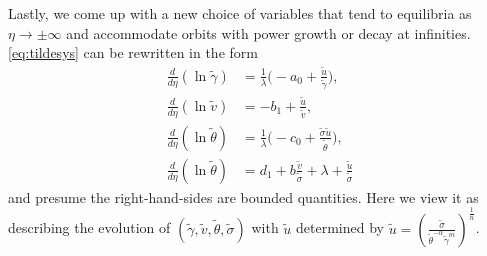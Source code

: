 \documentclass[a4paper,11pt]{article}
\def\tg{{\tilde{\gamma}}}
\def\tv{{\tilde{v}}}
\def\tth{{\tilde{\theta}}}
\def\ts{{\tilde{\sigma}}}
\def\tu{{\tilde{u}}}
\theoremstyle{remark}
\begin{document}
Lastly, we come up with a new choice of variables that tend to equilibria as $\eta \rightarrow \pm \infty$ and accommodate
orbits with power growth or decay at infinities. \eqref{eq:tildesys} can be rewritten in the form
\begin{equation}
 \label{eq:tildesys2}
\begin{aligned}
\frac{d}{d\eta}{(\ln{\tg})}  &=  \tfrac{1}{\lambda} \big (- a_0 +  \frac{\tu}{\tg} \big ),
\\
\frac{d}{d\eta}{(\ln{\tv})}  &=  - b_1 + \frac{\tu}{\tv} , 
\\
\frac{d}{d\eta}{(\ln{\tth})} &=   \tfrac{1}{\lambda} \big (- c_0 +  \frac{\ts \tu}{\tth} \big ), 
\\
\frac{d}{d\eta}{(\ln{\tth})} &= d_1 + b \frac{\tv}{\ts} + \lambda + \frac{\tu}{\ts}
\end{aligned}
\end{equation}
and presume the right-hand-sides are bounded quantities. Here we view it as describing the evolution of $(\tg,\tv,\tth,\ts)$ with $\tu$ determined by $\tu = \left ( \frac{\ts}{ \tth^{-\alpha} \tg^m} \right )^\frac{1}{n}$.
\end{document}
